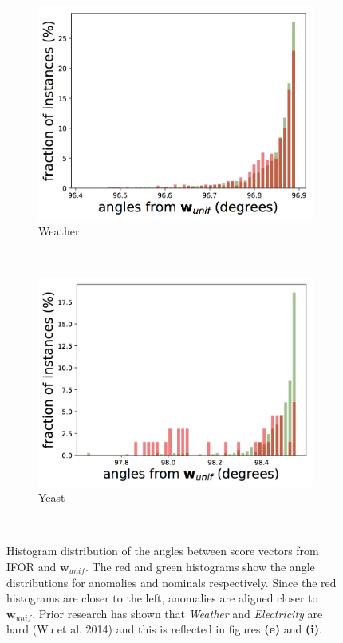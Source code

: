 \documentclass{article} %
\begin{document}
\begin{figure}[h]
\begin{subfigure}[b]{0.23\textwidth}
		\includegraphics[width=\textwidth]{angles/angles_weather_iforest.png}
		\caption{Weather}
		\label{fig:angles_weather}
	\end{subfigure}
	~
	\begin{subfigure}[b]{0.23\textwidth}
		\includegraphics[width=\textwidth]{angles/angles_yeast_iforest.png}
		\caption{Yeast}
		\label{fig:angles_yeast}
	\end{subfigure} \\[-1ex]
	\caption{Histogram distribution of the angles between score vectors from IFOR and ${\mathbf w}_{unif}$. The red and green histograms show the angle distributions for anomalies and nominals respectively. Since the red histograms are closer to the left, anomalies are aligned closer to ${\mathbf w}_{unif}$. Prior research has shown that \textit{Weather} and \textit{Electricity} are hard (Wu et al. 2014) and this is reflected in figures {\bf (e)} and {\bf (i)}.}
	\label{fig:angles_all}
\end{figure}
\end{document}
